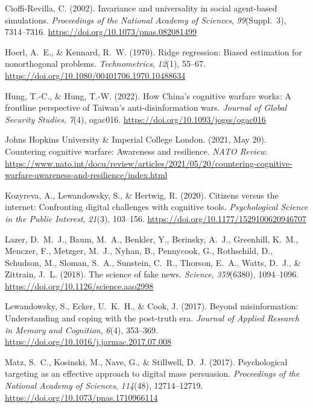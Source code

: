 \documentclass[11pt]{article}
\begin{document}
\noindent Cioffi-Revilla, C. (2002). Invariance and universality in social agent-based simulations. \textit{Proceedings of the National Academy of Sciences}, \textit{99}(Suppl.\ 3), 7314--7316. \url{https://doi.org/10.1073/pnas.082081499}\par

\noindent Hoerl, A.\ E., \& Kennard, R.\ W. (1970). Ridge regression: Biased estimation for nonorthogonal problems. \textit{Technometrics}, \textit{12}(1), 55--67. \url{https://doi.org/10.1080/00401706.1970.10488634}\par

\noindent Hung, T.-C., \& Hung, T.-W. (2022). How China's cognitive warfare works: A frontline perspective of Taiwan's anti-disinformation wars. \textit{Journal of Global Security Studies}, \textit{7}(4), ogac016. \url{https://doi.org/10.1093/jogss/ogac016}\par

\noindent Johns Hopkins University \& Imperial College London. (2021, May 20). Countering cognitive warfare: Awareness and resilience. \textit{NATO Review}. \url{https://www.nato.int/docu/review/articles/2021/05/20/countering-cognitive-warfare-awareness-and-resilience/index.html}\par

\noindent Kozyreva, A., Lewandowsky, S., \& Hertwig, R. (2020). Citizens versus the internet: Confronting digital challenges with cognitive tools. \textit{Psychological Science in the Public Interest}, \textit{21}(3), 103--156. \url{https://doi.org/10.1177/1529100620946707}\par

\noindent Lazer, D.\ M.\ J., Baum, M.\ A., Benkler, Y., Berinsky, A.\ J., Greenhill, K.\ M., Menczer, F., Metzger, M.\ J., Nyhan, B., Pennycook, G., Rothschild, D., Schudson, M., Sloman, S.\ A., Sunstein, C.\ R., Thorson, E.\ A., Watts, D.\ J., \& Zittrain, J.\ L. (2018). The science of fake news. \textit{Science}, \textit{359}(6380), 1094--1096. \url{https://doi.org/10.1126/science.aao2998}\par

\noindent Lewandowsky, S., Ecker, U.\ K.\ H., \& Cook, J. (2017). Beyond misinformation: Understanding and coping with the post-truth era. \textit{Journal of Applied Research in Memory and Cognition}, \textit{6}(4), 353--369. \url{https://doi.org/10.1016/j.jarmac.2017.07.008}\par

\noindent Matz, S.\ C., Kosinski, M., Nave, G., \& Stillwell, D.\ J. (2017). Psychological targeting as an effective approach to digital mass persuasion. \textit{Proceedings of the National Academy of Sciences}, \textit{114}(48), 12714--12719. \url{https://doi.org/10.1073/pnas.1710966114}\par
\end{document}
